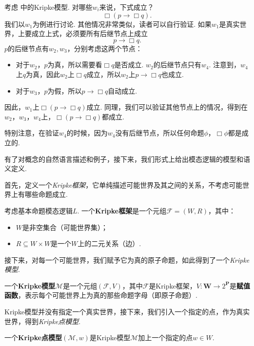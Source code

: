 \begin{example}\label{example:kripke-model-basic}
考虑 中的Kripke模型. 对哪些$w_i$来说，下式成立？
\[\Box (p\to\Box q).\]
我们以$w_1$为例进行讨论. 其他情况非常类似，读者可以自行验证. 如果$w_1$是真实世界，上要成立上式，必须要所有后继节点上成立
    \[p\to\Box q.\]
$p$的后继节点有$w_2,w_3$，分别考虑这两个节点：
\begin{itemize}
    \item 对于$w_2$，$p$为真，所以需要看$\Box q$是否成立. $w_2$的后继节点只有$w_4$. 注意到，$w_4$上$q$为真，因此$w_2$上$\Box q$成立，所以$w_2$上$p\to\Box q$也成立. 
    \item 对于$w_3$，$p$为假，所以$p\to\Box q$自动成立. 
\end{itemize}
因此，$w_1$上$\Box (p\to\Box q)$成立. 同理，我们可以验证其他节点上的情况，得到在$w_2$，$w_3$，$w_4$上，$\Box (p\to\Box q)$都成立. 

特别注意，在验证$w_4$的时候，因为$w_4$没有后继节点，所以任何命题$\phi$，$\Box\phi$都是成立的. 
\end{example}

有了对概念的自然语言描述和例子，接下来，我们形式上给出模态逻辑的模型和语义定义. 

首先，定义一个\textit{Kripke框架}，它单纯描述可能世界及其之间的关系，不考虑可能世界上有哪些命题成立. 

\begin{definition}[Kripke框架]
考虑基本命题模态逻辑$L$. 一个\textbf{Kripke框架}是一个元组$\mathcal F=(W,R)$，其中：
\begin{itemize}
\item $W$是非空集合（可能世界集）；
\item $R\subseteq W\times W$是一个$W$上的二元关系（边）. 
\end{itemize}
\end{definition}

接下来，对每一个可能世界，我们赋予它为真的原子命题，如此得到了一个\textit{Kripke模型}. 

\begin{definition}[Kripke模型]
一个\textbf{Kripke模型}$\mathcal{M}$是一个元组$(\mathcal F,V)$，其中$\mathcal F$是Kripke框架，$V:\mathbf W\to 2^{\mathbf P}$是\textbf{赋值函数}，表示每个可能世界上为真的那些命题字母（即原子命题）. 
\end{definition}

Kripke模型并没有指定一个真实世界，接下来，我们引入一个指定的点，作为真实世界，得到\textit{Kripke点模型}. 

\begin{definition}[Kripke点模型]
一个\textbf{Kripke点模型}$(\mathcal{M},w)$是Kripke模型$\mathcal M$加上一个指定的点$w\in W$. 
\end{definition}

